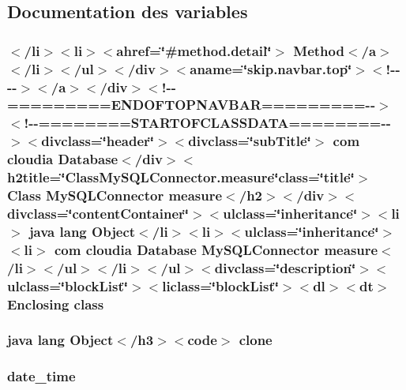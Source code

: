 \subsection{Documentation des variables}
\hypertarget{_my_s_q_l_connector_8measure_8html_a0594ae7d85ce56f68a3e575402f01033}{
\subsubsection[{class}]{\setlength{\rightskip}{0pt plus 5cm}$<$/li$>$$<$li$>$$<$ahref=\char`\"{}\#method.\-detail\char`\"{}$>$ Method$<$/{\bf a}$>$$<$/li$>$$<$/ul$>$$<$/div$>$$<$aname=\char`\"{}skip.\-navbar.\-top\char`\"{}$>$$<$!-\/-\/-\/-\/$>$$<$/a$>$$<$/div$>$$<$!-\/-\/=========E\-N\-D\-O\-F\-T\-O\-P\-N\-A\-V\-B\-A\-R=========-\/-\/$>$$<$!-\/-\/========S\-T\-A\-R\-T\-O\-F\-C\-L\-A\-S\-S\-D\-A\-T\-A========-\/-\/$>$$<$divclass=\char`\"{}header\char`\"{}$>$$<$divclass=\char`\"{}sub\-Title\char`\"{}$>$ com cloudia Database$<$/div$>$$<$h2title=\char`\"{}Class\-My\-S\-Q\-L\-Connector.\-measure\char`\"{}class=\char`\"{}title\char`\"{}$>$ Class {\bf My\-S\-Q\-L\-Connector} {\bf measure}$<$/h2$>$$<$/div$>$$<$divclass=\char`\"{}content\-Container\char`\"{}$>$$<$ulclass=\char`\"{}inheritance\char`\"{}$>$$<$li$>$ java lang Object$<$/li$>$$<$li$>$$<$ulclass=\char`\"{}inheritance\char`\"{}$>$$<$li$>$ com cloudia Database {\bf My\-S\-Q\-L\-Connector} {\bf measure}$<$/li$>$$<$/ul$>$$<$/li$>$$<$/ul$>$$<$divclass=\char`\"{}description\char`\"{}$>$$<$ulclass=\char`\"{}block\-List\char`\"{}$>$$<$liclass=\char`\"{}block\-List\char`\"{}$>$$<$dl$>$$<${\bf dt}$>$ Enclosing class}}\label{_my_s_q_l_connector_8measure_8html_a0594ae7d85ce56f68a3e575402f01033}
\hypertarget{_my_s_q_l_connector_8measure_8html_adc9607fcabf6f2d7f401ad52015ef6e0}{
\subsubsection[{clone}]{\setlength{\rightskip}{0pt plus 5cm}java lang Object$<$/h3$>$$<$code$>$ clone}}\label{_my_s_q_l_connector_8measure_8html_adc9607fcabf6f2d7f401ad52015ef6e0}
\hypertarget{_my_s_q_l_connector_8measure_8html_a2ebe356a2a4f9bab3a6c50f65ccc86d5}{
\subsubsection[{date\-\_\-time}]{\setlength{\rightskip}{0pt plus 5cm}date\-\_\-time}}\label{_my_s_q_l_connector_8measure_8html_a2ebe356a2a4f9bab3a6c50f65ccc86d5}
